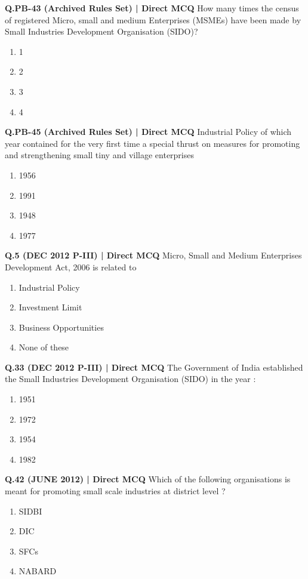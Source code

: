 \documentclass{article}
\begin{document}
\textbf{Q.PB-43 (Archived Rules Set) | Direct MCQ}
How many times the census of registered Micro, small and medium Enterprises (MSMEs) have been made by Small Industries Development Organisation (SIDO)?
\begin{enumerate}[label=(\arabic*)]
    \item 1
    \item 2
    \item 3
    \item 4
\end{enumerate}

\textbf{Q.PB-45 (Archived Rules Set) | Direct MCQ}
Industrial Policy of which year contained for the very first time a special thrust on measures for promoting and strengthening small tiny and village enterprises
\begin{enumerate}[label=(\arabic*)]
    \item 1956
    \item 1991
    \item 1948
    \item 1977
\end{enumerate}

\textbf{Q.5 (DEC 2012 P-III) | Direct MCQ}
Micro, Small and Medium Enterprises Development Act, 2006 is related to
\begin{enumerate}[label=(\arabic*)]
    \item Industrial Policy
    \item Investment Limit
    \item Business Opportunities
    \item None of these
\end{enumerate}

\textbf{Q.33 (DEC 2012 P-III) | Direct MCQ}
The Government of India established the Small Industries Development Organisation (SIDO) in the year :
\begin{enumerate}[label=(\arabic*)]
    \item 1951
    \item 1972
    \item 1954
    \item 1982
\end{enumerate}

\textbf{Q.42 (JUNE 2012) | Direct MCQ}
Which of the following organisations is meant for promoting small scale industries at district level ?
\begin{enumerate}[label=(\arabic*)]
    \item SIDBI
    \item DIC
    \item SFCs
    \item NABARD
\end{enumerate}
\end{document}
